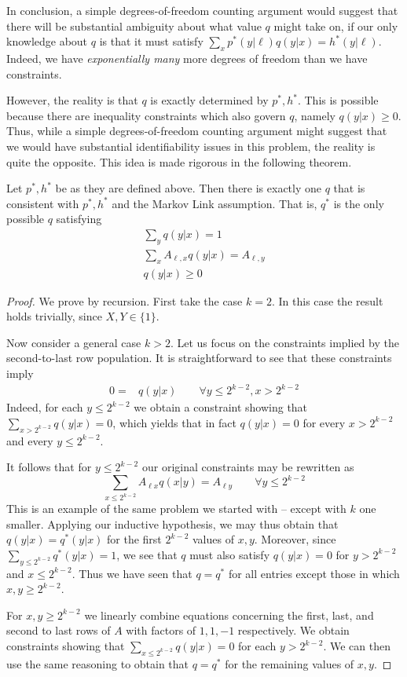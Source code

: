 In conclusion, a simple degrees-of-freedom counting argument would suggest that there will be substantial ambiguity about what value $q$ might take on, if our only knowledge about $q$ is that it must satisfy $\sum_x p^*(y|\ell)q(y|x)=h^*(y|\ell)$.  Indeed, we have \emph{exponentially many} more degrees of freedom than we have constraints.  

However, the reality is that $q$ is exactly determined by $p^*,h^*$.  This is possible because there are inequality constraints which also govern $q$, namely $q(y|x)\geq 0$.  Thus, while a simple degrees-of-freedom counting argument might suggest that we would have substantial identifiability issues in this problem, the reality is quite the opposite.  This idea is made rigorous in the following theorem.  

\begin{thm}\label{thm:miracle}
Let $p^*,h^*$ be as they are defined above.  Then there is exactly one $q$ that is consistent with $p^*,h^*$ and the Markov Link assumption.  That is, $q^*$ is the only possible $q$ satisfying
\begin{gather*}
\sum_y q(y|x)=1 \\
\sum_x A_{\ell,x}q(y|x)=A_{\ell,y}\\
q(y|x)\geq 0
\end{gather*}
\end{thm} 
\begin{proof}
We prove by recursion.  First take the case $k=2$.  In this case the result holds trivially, since $X,Y\in\{1\}$.

Now consider a general case $k>2$.  Let us focus on the constraints implied by the second-to-last row population.  It is straightforward to see that these constraints imply
\begin{align*}
0=&q(y|x) \qquad \forall y\leq 2^{k-2},x>2^{k-2}
\end{align*}
Indeed, for each $y\leq 2^{k-2}$ we obtain a constraint showing that $\sum_{x>2^{k-2}}q(y|x)=0$, which yields that in fact $q(y|x)=0$ for every $x>2^{k-2}$ and every $y\leq 2^{k-2}$.

It follows that for $y\leq 2^{k-2}$ our original constraints may be rewritten as
\[
\sum_{x\leq2^{k-2}} A_{\ell x} q(x|y) = A_{\ell y} \qquad \forall y\leq 2^{k-2}
\]
This is an example of the same problem we started with -- except with $k$ one smaller.  Applying our inductive hypothesis, we may thus obtain that $q(y|x)=q^*(y|x)$ for the first $2^{k-2}$ values of $x,y$.  Moreover, since $\sum_{y\leq 2^{k-2}} q^*(y|x)=1$, we see that $q$ must also satisfy $q(y|x)=0$ for $y>2^{k-2}$ and $x\leq 2^{k-2}$.  Thus we have seen that $q=q^*$ for all entries except those in which $x,y\geq 2^{k-2}$.

For $x,y \geq2^{k-2}$ we linearly combine equations concerning the first, last, and second to last rows of $A$ with factors of $1,1,-1$ respectively.  We obtain constraints showing that $\sum_{x\leq2^{k-2}}q(y|x)=0$ for each $y>2^{k-2}$.  We can then use the same reasoning to obtain that $q=q^*$ for the remaining values of $x,y$.
\end{proof}

